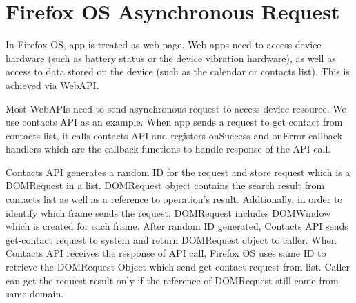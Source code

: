 \documentclass[12pt]{article}
\begin{document}
\section*{Firefox OS Asynchronous Request}
In Firefox OS, app is treated as web page. Web apps need to access device hardware (such as battery status or the device vibration hardware), as well as access to data stored on the device (such as the calendar or contacts list). This is achieved via WebAPI. %

Most WebAPIs need to send asynchronous request to access device resource. We use contacts API as an example. When app sends a request to get contact from contacts list,  it calls contacts API and registers onSuccess and onError callback handlers which are the callback functions to handle response of the API call. %

Contacts API generates a random ID for the request and store request which is a DOMRequest in a list. DOMRequest object contains the search result from contacts list as well as a reference to operation's result. Addtionally, in order to identify which frame sends the request, DOMRequest includes DOMWindow which is created for each frame. After random ID generated, Contacts API sends get-contact request to system and return DOMRequest object to caller.  %
When Contacts API receives the response of API call, Firefox OS uses same ID to retrieve the DOMRequest Object which send get-contact request from list. Caller can get the request result only if the reference of DOMRequest still come from same domain.   %
\end{document}
